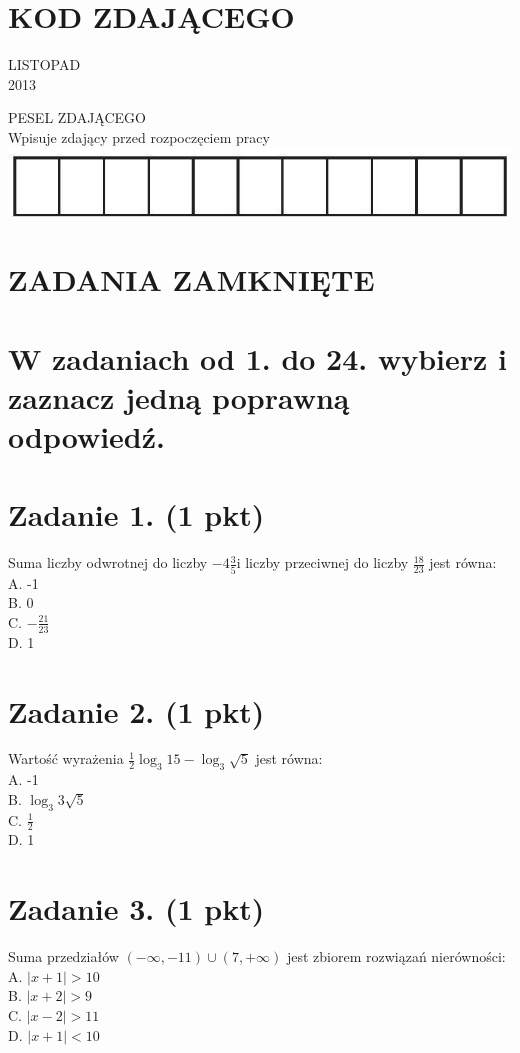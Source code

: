 \documentclass[10pt]{article}
\begin{document}
\section*{KOD ZDAJĄCEGO}
LISTOPAD\\
2013

PESEL ZDAJĄCEGO\\
Wpisuje zdający przed rozpoczęciem pracy\\
\includegraphics[max width=\textwidth, center]{2024_11_21_769d5953f978b92e06f5g-01(1)}

\section*{ZADANIA ZAMKNIĘTE}
\section*{W zadaniach od 1. do 24. wybierz i zaznacz jedną poprawną odpowiedź.}
\section*{Zadanie 1. (1 pkt)}
Suma liczby odwrotnej do liczby \(-4 \frac{3}{5} \mathrm{i}\) liczby przeciwnej do liczby \(\frac{18}{23}\) jest równa:\\
A. -1\\
B. 0\\
C. \(-\frac{21}{23}\)\\
D. 1

\section*{Zadanie 2. (1 pkt)}
Wartość wyrażenia \(\frac{1}{2} \log _{3} 15-\log _{3} \sqrt{5}\) jest równa:\\
A. -1\\
B. \(\log _{3} 3 \sqrt{5}\)\\
C. \(\frac{1}{2}\)\\
D. 1

\section*{Zadanie 3. (1 pkt)}
Suma przedziałów \((-\infty,-11) \cup(7,+\infty)\) jest zbiorem rozwiązań nierówności:\\
A. \(|x+1|>10\)\\
B. \(|x+2|>9\)\\
C. \(|x-2|>11\)\\
D. \(|x+1|<10\)
\end{document}
